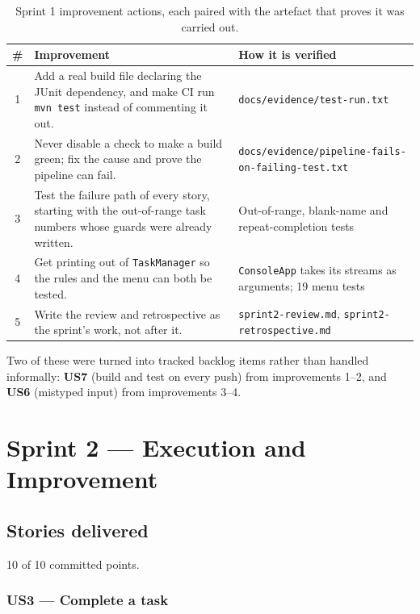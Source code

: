 \documentclass[11pt,a4paper]{article}
\newcommand{\code}[1]{\texttt{\small #1}}
\begin{document}
\begin{table}[h]
\centering
\small
\begin{tabularx}{\textwidth}{@{}c X L{5.1cm}@{}}
\toprule
\textbf{\#} & \textbf{Improvement} & \textbf{How it is verified} \\
 & Add a real build file declaring the JUnit dependency, and make CI run \code{mvn test} instead of commenting it out. & \code{docs/evidence/test-run.txt} \\
2 & Never disable a check to make a build green; fix the cause and prove the pipeline can fail. & \code{docs/evidence/pipeline-\allowbreak fails-on-failing-test.txt} \\
3 & Test the failure path of every story, starting with the out-of-range task numbers whose guards were already written. & Out-of-range, blank-name and repeat-completion tests \\
4 & Get printing out of \code{TaskManager} so the rules and the menu can both be tested. & \code{ConsoleApp} takes its streams as arguments; 19 menu tests \\
5 & Write the review and retrospective as the sprint's work, not after it. & \code{sprint2-review.md}, \code{sprint2-retrospective.md} \\
\bottomrule
\end{tabularx}
\caption{Sprint 1 improvement actions, each paired with the artefact that
proves it was carried out.}
\end{table}

Two of these were turned into tracked backlog items rather than handled
informally: \textbf{US7} (build and test on every push) from improvements 1--2,
and \textbf{US6} (mistyped input) from improvements 3--4.

\section{Sprint 2 --- Execution and Improvement}

\subsection{Stories delivered}

10 of 10 committed points.

\subsubsection*{US3 --- Complete a task}
\end{document}
